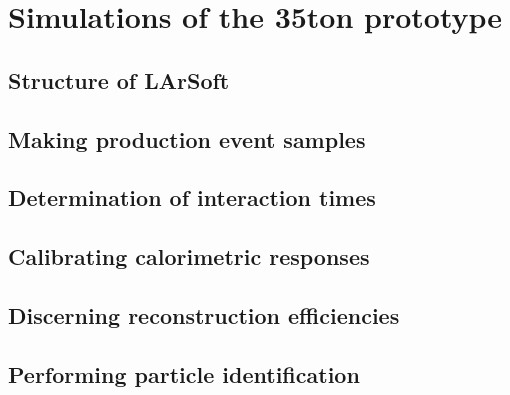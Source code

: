 
\chapter{Simulations of the 35ton prototype}  %

\ifpdf
    \graphicspath{{35tonSimulation/Figs/Raster/}{35tonSimulation/Figs/PDF/}{35tonSimulation/Figs/}}
\else
    \graphicspath{{35tonSimulation/Figs/Vector/}{35tonSimulation/Figs/}}
\fi

\section{Structure of LArSoft} %

\section{Making production event samples} %

\section{Determination of interaction times} \label{sec:SimInteractionTimes}%

\section{Calibrating calorimetric responses}  %

\section{Discerning reconstruction efficiencies}  %

\section{Performing particle identification}  %

